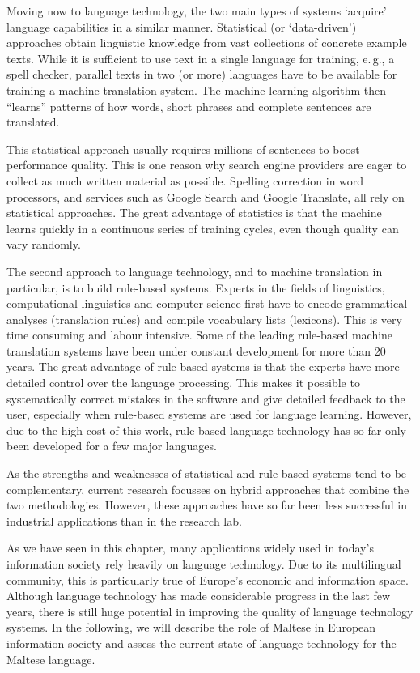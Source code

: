 \documentclass[]{../../metanetpaper}
\begin{document}
\begin{multicols}{2}
Moving now to language technology, the two main types of systems ‘acquire’ language capabilities in a similar manner. Statistical (or ‘data-driven’) approaches obtain linguistic knowledge from vast collections of concrete example texts. While it is sufficient to use text in a single language for training, e.\,g., a spell checker, parallel texts in two (or more) languages have to be available for training a machine translation system. The machine learning algorithm then “learns” patterns of how words, short phrases and complete sentences are translated. 

This statistical approach usually requires millions of sentences to boost performance quality. This is one reason why search engine providers are eager to collect as much written material as possible. Spelling correction in word processors, and services such as Google Search and Google Translate, all rely on statistical approaches. The great advantage of statistics is that the machine learns quickly in a continuous series of training cycles, even though quality can vary randomly.

The second approach to language technology, and to machine translation in particular, is to build rule-based systems. Experts in the fields of linguistics, computational linguistics and computer science first have to encode grammatical analyses (translation rules) and compile vocabulary lists (lexicons). This is very time consuming and labour intensive. Some of the leading rule-based machine translation systems have been under constant development for more than 20 years. The great advantage of rule-based systems is that the experts have more detailed control over the language processing. This makes it possible to systematically correct mistakes in the software and give detailed feedback to the user, especially when rule-based systems are used for language learning. However, due to the high cost of this work, rule-based language technology has so far only been developed for a few major languages. 


As the strengths and weaknesses of statistical and rule-based systems tend to be complementary, current research focusses on hybrid approaches that combine the two methodologies. However, these approaches have so far been less successful in industrial applications than in the research lab. 

As we have seen in this chapter, many applications widely used in today’s information society rely heavily on language technology. Due to its multilingual community, this is particularly true of Europe’s economic and information space. Although language technology has made considerable progress in the last few years, there is still huge potential in improving the quality of language technology systems. In the following, we will describe the role of Maltese in European information society and assess the current state of language technology for the Maltese language.

\end{multicols}
\end{document}

